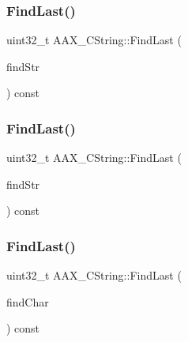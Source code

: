 \mbox{\label{a01573_abe6d77c979b5c96cee327fdae3231694}} 
\subsubsection{\texorpdfstring{FindLast()}{FindLast()}\hspace{0.1cm}{\footnotesize\ttfamily [1/3]}}
{\footnotesize\ttfamily uint32\+\_\+t A\+A\+X\+\_\+\+C\+String\+::\+Find\+Last (\begin{DoxyParamCaption}\item[{const \mbox{\hyperlink{a01573}{A\+A\+X\+\_\+\+C\+String}} \&}]{find\+Str }\end{DoxyParamCaption}) const}

\mbox{\label{a01573_aa0e71e9f1fcb2a22ad03fe87d48f3d0f}} 
\subsubsection{\texorpdfstring{FindLast()}{FindLast()}\hspace{0.1cm}{\footnotesize\ttfamily [2/3]}}
{\footnotesize\ttfamily uint32\+\_\+t A\+A\+X\+\_\+\+C\+String\+::\+Find\+Last (\begin{DoxyParamCaption}\item[{const char $\ast$}]{find\+Str }\end{DoxyParamCaption}) const}

\mbox{\label{a01573_a7be05cb2b2f1a67a598879c089aa2cbc}} 
\subsubsection{\texorpdfstring{FindLast()}{FindLast()}\hspace{0.1cm}{\footnotesize\ttfamily [3/3]}}
{\footnotesize\ttfamily uint32\+\_\+t A\+A\+X\+\_\+\+C\+String\+::\+Find\+Last (\begin{DoxyParamCaption}\item[{char}]{find\+Char }\end{DoxyParamCaption}) const}

